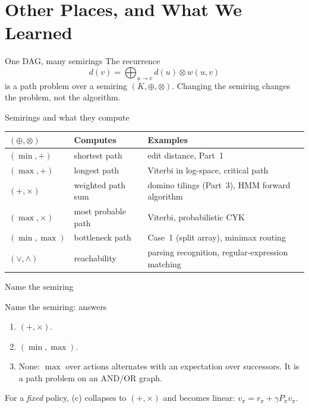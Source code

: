 \section{Other Places, and What We Learned}

\begin{frame}{One DAG, many semirings}
	The recurrence
	\[
		d(v)=\bigoplus_{u\to v}d(u)\otimes w(u,v)
	\]
	is a path problem over a semiring $(K,\oplus,\otimes)$.
	Changing the semiring changes the problem, not the algorithm.
\end{frame}

\begin{frame}{Semirings and what they compute}
	\begin{center}
		\renewcommand{\arraystretch}{1.25}
		\begin{tabularx}{\textwidth}{@{}llX@{}}
			\toprule
			$(\oplus,\otimes)$ & Computes & Examples\\
			\midrule
			$(\min,+)$ & shortest path & edit distance, Part~1\\
			$(\max,+)$ & longest path & Viterbi in log-space, critical path\\
			$(+,\times)$ & weighted path sum & domino tilings (Part~3), HMM forward algorithm\\
			$(\max,\times)$ & most probable path & Viterbi, probabilistic CYK\\
			$(\min,\max)$ & bottleneck path & Case~1 (split array), minimax routing\\
			$(\vee,\wedge)$ & reachability & parsing recognition, regular-expression matching\\
			\bottomrule
		\end{tabularx}
	\end{center}
\end{frame}

\begin{frame}{Name the semiring}
\end{frame}

\begin{frame}{Name the semiring: answers}
	\begin{enumerate}
		\item[(a)] $(+,\times)$.
		\item[(b)] $(\min,\max)$.
		\item[(c)] \alert{None}: $\max$ over actions alternates with an expectation over successors.
		It is a path problem on an AND/OR graph.
	\end{enumerate}

	\seprule

	For a \emph{fixed} policy, (c) collapses to $(+,\times)$ and becomes linear: $v_\pi=r_\pi+\gamma P_\pi v_\pi$.
\end{frame}

